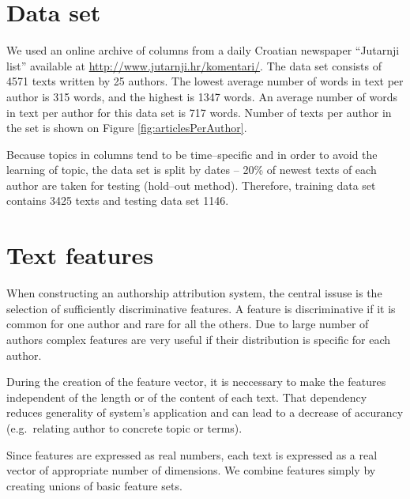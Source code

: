\documentclass[11pt,english]{article}
\begin{document}
\begin{multicols}{2}
\section{Data set}
\label{sec:podatci}
We used an online archive of columns from a daily Croatian newspaper ``Jutarnji
list'' available at \url{http://www.jutarnji.hr/komentari/}. The data set
consists of 4571 texts written by 25 authors. The lowest average number of words
in text per author is 315 words, and the highest is 1347 words. An average number
of words in text per author for this data set is 717 words. Number of texts per
author in the set is shown on Figure \ref{fig:articlesPerAuthor}.

Because topics in columns tend to be time--specific and in order to avoid the
learning of topic, the data set is split by dates -- 20\% of newest texts of
each author are taken for testing (hold--out method). Therefore, training data
set contains 3425 texts and testing data set 1146.

\begin{minipage}{0.8\linewidth}
\vspace{10pt}
\centerline{\resizebox{1.4\linewidth}{!}{}}%
%
\label{fig:articlesPerAuthor}
\end{minipage}

\section{Text features}
When constructing an authorship attribution system, the central issuse is the selection of sufficiently discriminative features. A feature is
discriminative if it is common for one author and rare for all the others. Due to large number of authors complex features are very useful if their
distribution is specific for each author. %


During the creation of the feature vector, it is neccessary to make the
features independent of the length or of the content of each text. That
dependency reduces generality of system's application and can lead to a decrease of accurancy
(e.g.\ relating author to concrete topic or terms).

Since features are expressed as real numbers, each text is expressed as a real
vector of appropriate number of dimensions. We combine features simply by creating unions of basic feature sets.


\end{multicols}
\end{document}
